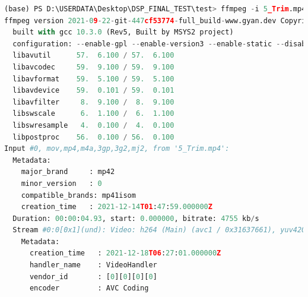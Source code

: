 \documentclass[10pt,UTF8]{ctexart}
\begin{document}
\begin{lstlisting}[language={python}]
(base) PS D:\USERDATA\Desktop\DSP_FINAL_TEST\test> ffmpeg -i 5_Trim.mp4 -s 320x240 -pix_fmt yuv420p -r 15 5_Trim.yuv
ffmpeg version 2021-09-22-git-447cf53774-full_build-www.gyan.dev Copyright (c) 2000-2021 the FFmpeg developers
  built with gcc 10.3.0 (Rev5, Built by MSYS2 project)
  configuration: --enable-gpl --enable-version3 --enable-static --disable-w32threads --disable-autodetect --enable-fontconfig --enable-iconv --enable-gnutls --enable-libxml2 --enable-gmp --enable-lzma --enable-libsnappy --enable-zlib --enable-librist --enable-libsrt --enable-libssh --enable-libzmq --enable-avisynth --enable-libbluray --enable-libcaca --enable-sdl2 --enable-libdav1d --enable-libzvbi --enable-librav1e --enable-libsvtav1 --enable-libwebp --enable-libx264 --enable-libx265 --enable-libxvid --enable-libaom --enable-libopenjpeg --enable-libvpx --enable-libass --enable-frei0r --enable-libfreetype --enable-libfribidi --enable-libvidstab --enable-libvmaf --enable-libzimg --enable-amf --enable-cuda-llvm --enable-cuvid --enable-ffnvcodec --enable-nvdec --enable-nvenc --enable-d3d11va --enable-dxva2 --enable-libmfx --enable-libglslang --enable-vulkan --enable-opencl --enable-libcdio --enable-libgme --enable-libmodplug --enable-libopenmpt --enable-libopencore-amrwb --enable-libmp3lame --enable-libshine --enable-libtheora --enable-libtwolame --enable-libvo-amrwbenc --enable-libilbc --enable-libgsm --enable-libopencore-amrnb --enable-libopus --enable-libspeex --enable-libvorbis --enable-ladspa --enable-libbs2b --enable-libflite --enable-libmysofa --enable-librubberband --enable-libsoxr --enable-chromaprint
  libavutil      57.  6.100 / 57.  6.100
  libavcodec     59.  9.100 / 59.  9.100
  libavformat    59.  5.100 / 59.  5.100
  libavdevice    59.  0.101 / 59.  0.101
  libavfilter     8.  9.100 /  8.  9.100
  libswscale      6.  1.100 /  6.  1.100
  libswresample   4.  0.100 /  4.  0.100
  libpostproc    56.  0.100 / 56.  0.100
Input #0, mov,mp4,m4a,3gp,3g2,mj2, from '5_Trim.mp4':
  Metadata:
    major_brand     : mp42
    minor_version   : 0
    compatible_brands: mp41isom
    creation_time   : 2021-12-14T01:47:59.000000Z
  Duration: 00:00:04.93, start: 0.000000, bitrate: 4755 kb/s
  Stream #0:0[0x1](und): Video: h264 (Main) (avc1 / 0x31637661), yuv420p, 1280x720 [SAR 1:1 DAR 16:9], 4733 kb/s, 30 fps, 30 tbr, 30k tbn (default)
    Metadata:
      creation_time   : 2021-12-18T06:27:01.000000Z
      handler_name    : VideoHandler
      vendor_id       : [0][0][0][0]
      encoder         : AVC Coding

\end{lstlisting}
\end{document}

